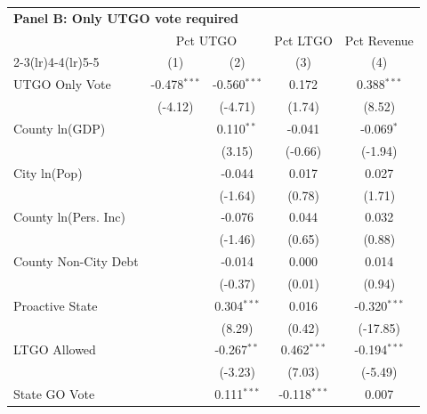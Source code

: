 \begingroup
\centering
\begin{tabular*}{\textwidth}{@{\extracolsep{\fill}}lcccc}
\multicolumn{5}{l}{\textbf{Panel B: Only UTGO vote required}}\\

\addlinespace
   \toprule
    & \multicolumn{2}{c}{Pct UTGO} & Pct LTGO & Pct Revenue\\
   \cmidrule(lr){2-3}\cmidrule(lr){4-4}\cmidrule(lr){5-5}
                               & (1)            & (2)            & (3)            & (4)\\  
   \midrule 
   UTGO Only Vote              & -0.478$^{***}$ & -0.560$^{***}$ & 0.172          & 0.388$^{***}$\\   
                               & (-4.12)       & (-4.71)       & (1.74)        & (8.52)\\   
   County ln(GDP)              &                & 0.110$^{**}$   & -0.041         & -0.069$^{*}$\\   
                               &                & (3.15)        & (-0.66)       & (-1.94)\\   
   City ln(Pop)                &                & -0.044         & 0.017          & 0.027\\   
                               &                & (-1.64)       & (0.78)        & (1.71)\\   
   County ln(Pers. Inc)        &                & -0.076         & 0.044          & 0.032\\   
                               &                & (-1.46)       & (0.65)        & (0.88)\\   
   County Non-City Debt        &                & -0.014         & 0.000          & 0.014\\   
                               &                & (-0.37)       & (0.01)        & (0.94)\\   
   Proactive State             &                & 0.304$^{***}$  & 0.016          & -0.320$^{***}$\\   
                               &                & (8.29)        & (0.42)        & (-17.85)\\   
   LTGO Allowed                &                & -0.267$^{**}$  & 0.462$^{***}$  & -0.194$^{***}$\\   
                               &                & (-3.23)       & (7.03)        & (-5.49)\\   
   State GO Vote               &                & 0.111$^{***}$  & -0.118$^{***}$ & 0.007\\   

\end{tabular*}
